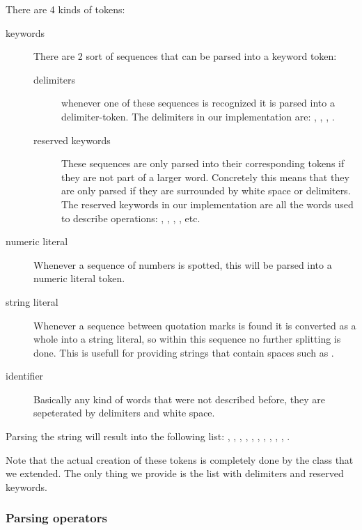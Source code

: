 \par
There are 4 kinds of tokens:
\begin{description} 
\item[keywords] There are 2 sort of sequences that can be parsed into a keyword
token:
	\begin{description}
	\item[delimiters] whenever one of these sequences is recognized it is parsed
	into a delimiter-token. The delimiters in our implementation are: \sn{\{},
	\sn{\}}, \sn{,}, \sn{:}.
	\item[reserved keywords] These sequences are only parsed into their
	corresponding tokens if they are not part of a larger word. Concretely this
	means that they are only parsed if they are surrounded by white space or
	delimiters. The reserved keywords in our implementation are all the words used
	to describe operations: , , , , etc.
	\end{description}
\item[numeric literal] Whenever a sequence of numbers is spotted, this will be
parsed into a numeric literal token.
\item[string literal] Whenever a sequence between quotation marks is found it is
converted as a whole into a string literal, so within this sequence no further
splitting is done. This is usefull for providing strings that contain spaces
such as .
\item[identifier] Basically any kind of words that were not described before,
they are sepeterated by delimiters and white space.
\end{description}
	
\par
Parsing the string  will result into
the following list: , , , , , , , ,
, , .
 
\par
Note that the actual creation of these tokens is completely done by the
 class that we extended. The only thing we provide is the
list with delimiters and reserved keywords.


\subsubsection{Parsing operators}

